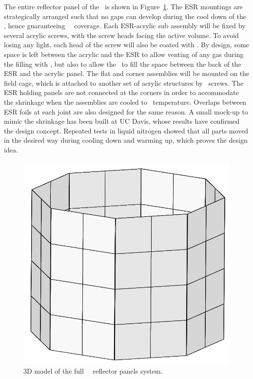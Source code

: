 The entire reflector panel of the \TPC\ is shown in Figure~\ref{fig:re_panel}. The ESR mountings are strategically arranged such that no gaps can develop during the cool down of the \TPC, hence guaranteeing \DSkTPBCoverage\ \TPB\ coverage. Each ESR-acrylic sub assembly will be fixed by several acrylic screws, with the screw heads facing the active volume. To avoid losing any light, each head of the screw will also be coated with \TPB. By design, some space is left between the acrylic and the ESR to allow venting of any gas during the filling with \LAr, but also to allow the \LAr\ to fill the space between the back of the ESR and the acrylic panel. The flat and corner assemblies will be mounted on the field cage, which is attached to another set of acrylic structures by \PTFE\ screws. The ESR holding panels are not connected at the corners in order to accommodate the shrinkage when the assemblies are cooled to \LAr\ temperature. Overlaps between ESR foils at each joint are also designed for the same reason. A small mock-up to mimic the shrinkage has been built at UC Davis, whose results have confirmed the design concept. Repeated tests in liquid nitrogen showed that all parts moved in the desired way during cooling down and warming up, which proves the design idea.

\begin{figure}[t!]
\centering
\includegraphics[width=\columnwidth]{./Figures/TPC-reflector_panel.png}
\caption[3D model of the full \DSks\ \LArTPC\ reflector panels system]{3D model of the full \DSks\ \LArTPC\ reflector panels system.}
\label{fig:re_panel}
\end{figure}

